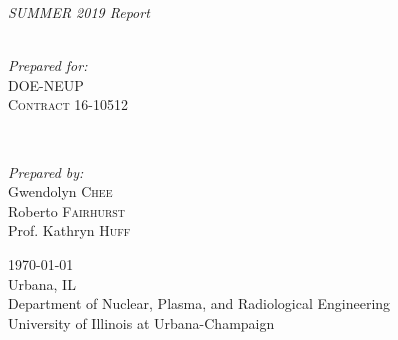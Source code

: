 \documentclass[11pt,letterpaper]{article}
\begin{document}
\begin{titlepage}
	{\LARGE\textit{SUMMER 2019 Report}}\\[0.4cm] %
	\HRule\\[1.5cm]
	
	
	\begin{minipage}{0.4\textwidth}
		\begin{flushleft}
			\large
			\textit{Prepared for:}\\
			\textsc{DOE-NEUP}\\ %
			\textsc{Contract} 16-10512\\ %
		\end{flushleft}
	\end{minipage}
	~
	\begin{minipage}{0.4\textwidth}
		\begin{flushright}
			\large
			\textit{Prepared by:}\\
			Gwendolyn \textsc{Chee}\\ %
			Roberto \textsc{Fairhurst}\\ %
			Prof. Kathryn \textsc{Huff} %
		\end{flushright}
	\end{minipage}
	
	
	
	\vfill\vfill\vfill %
	
	{\large\today}\\ %
	\vfill
	{\large Urbana, IL}\\ %
	{\large Department of Nuclear, Plasma, and Radiological Engineering\\
		University of Illinois at Urbana-Champaign}\\ %
	
	
	
	\vfill %
	
\end{titlepage}
\end{document}
